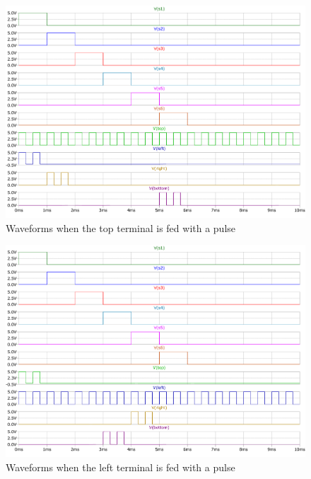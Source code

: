 \documentclass[a4paper,11pt]{article}%
\begin{document}
\begin{figure}[H]
	\centering
	\includegraphics[scale=0.5]{figures/2part2/top.pdf}
	\caption{Waveforms when the top terminal is fed with a pulse}
\end{figure}

\begin{figure}[H]
	\centering
	\includegraphics[scale=0.5]{figures/2part2/left.pdf}
	\caption{Waveforms when the left terminal is fed with a pulse}
\end{figure}
\end{document}
